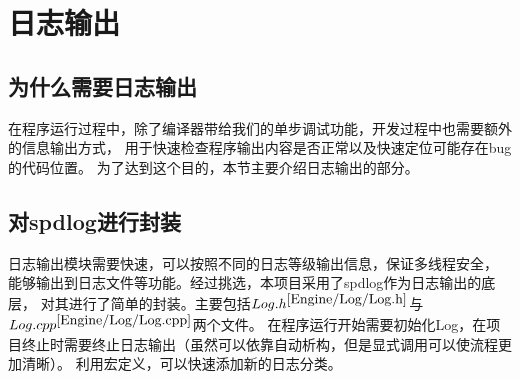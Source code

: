 \section{日志输出}

\subsection{为什么需要日志输出}
在程序运行过程中，除了编译器带给我们的单步调试功能，开发过程中也需要额外的信息输出方式，
用于快速检查程序输出内容是否正常以及快速定位可能存在bug的代码位置。
为了达到这个目的，本节主要介绍日志输出的部分。

\subsection{对spdlog进行封装}
日志输出模块需要快速，可以按照不同的日志等级输出信息，保证多线程安全，
能够输出到日志文件等功能。经过挑选，本项目采用了spdlog作为日志输出的底层，
对其进行了简单的封装。主要包括$Log.h^{\ref{Engine/Log/Log.h}}$与$Log.cpp^{\ref{Engine/Log/Log.cpp}}$两个文件。
在程序运行开始需要初始化Log，在项目终止时需要终止日志输出（虽然可以依靠自动析构，但是显式调用可以使流程更加清晰）。
利用宏定义，可以快速添加新的日志分类。

